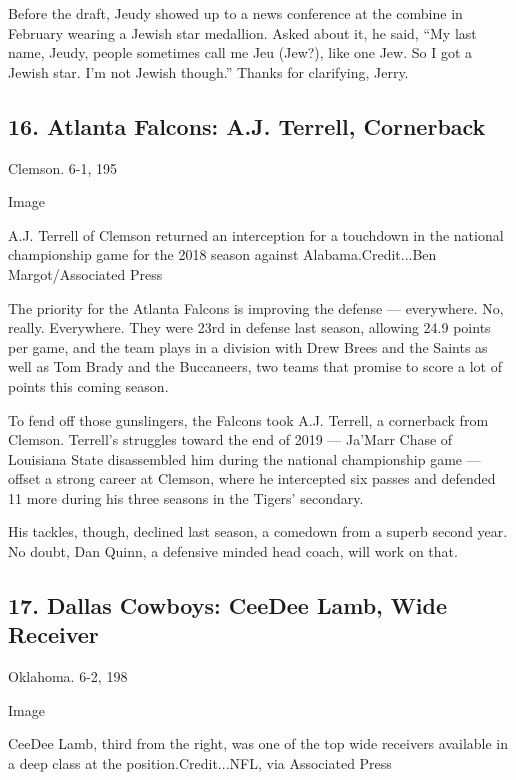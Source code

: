 Before the draft, Jeudy showed up to a news conference at the combine in
February wearing a Jewish star medallion. Asked about it, he said, ``My
last name, Jeudy, people sometimes call me Jeu (Jew?), like one Jew. So
I got a Jewish star. I'm not Jewish though.'' Thanks for clarifying,
Jerry.

\hypertarget{16-atlanta-falcons-aj-terrell-cornerback}{%
\subsection{16. Atlanta Falcons: A.J. Terrell,
Cornerback}\label{16-atlanta-falcons-aj-terrell-cornerback}}

Clemson. 6-1, 195

Image

A.J. Terrell of Clemson returned an interception for a touchdown in the
national championship game for the 2018 season against
Alabama.Credit...Ben Margot/Associated Press

The priority for the Atlanta Falcons is improving the defense ---
everywhere. No, really. Everywhere. They were 23rd in defense last
season, allowing 24.9 points per game, and the team plays in a division
with Drew Brees and the Saints as well as Tom Brady and the Buccaneers,
two teams that promise to score a lot of points this coming season.

To fend off those gunslingers, the Falcons took A.J. Terrell, a
cornerback from Clemson. Terrell's struggles toward the end of 2019 ---
Ja'Marr Chase of Louisiana State disassembled him during the national
championship game --- offset a strong career at Clemson, where he
intercepted six passes and defended 11 more during his three seasons in
the Tigers' secondary.

His tackles, though, declined last season, a comedown from a superb
second year. No doubt, Dan Quinn, a defensive minded head coach, will
work on that.

\hypertarget{17-dallas-cowboys-ceedee-lamb-wide-receiver}{%
\subsection{17. Dallas Cowboys: CeeDee Lamb, Wide
Receiver}\label{17-dallas-cowboys-ceedee-lamb-wide-receiver}}

Oklahoma. 6-2, 198

Image

CeeDee Lamb, third from the right, was one of the top wide receivers
available in a deep class at the position.Credit...NFL, via Associated
Press

